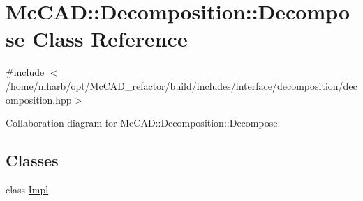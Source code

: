 \hypertarget{classMcCAD_1_1Decomposition_1_1Decompose}{}\section{Mc\+C\+AD\+:\+:Decomposition\+:\+:Decompose Class Reference}
\label{classMcCAD_1_1Decomposition_1_1Decompose}


{\ttfamily \#include $<$/home/mharb/opt/\+Mc\+C\+A\+D\+\_\+refactor/build/includes/interface/decomposition/decomposition.\+hpp$>$}



Collaboration diagram for Mc\+C\+AD\+:\+:Decomposition\+:\+:Decompose\+:
\subsection*{Classes}
\begin{DoxyCompactItemize}
\item 
class \hyperlink{classMcCAD_1_1Decomposition_1_1Decompose_1_1Impl}{Impl}
\end{DoxyCompactItemize}
